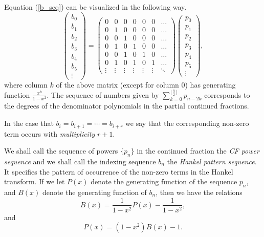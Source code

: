 \documentclass[12pt,reqno]{article}
\theoremstyle{definition}
\begin{document}
Equation (\ref{b_seq}) can be visualized in the following way.
\begin{displaymath}
\left(\begin{array}{c} b_0 \\ b_1 \\b_2\\ b_3 \\b_4 \\b_5 \\ \vdots \end{array}\right)=
\left(\begin{array}{ccccccc}0 & 0 & 0 & 0 & 0 & 0 & \ldots \\
                            0 & 1 & 0 & 0 & 0 & 0 & \ldots \\
                            0 & 0 & 1 & 0& 0 & 0 & \ldots \\
                            0 & 1 & 0 & 1 & 0 & 0 & \ldots \\
                            0 & 0 & 1&  0 & 1 & 0 & \ldots \\
                            0 & 1  & 0 & 1 & 0 & 1 &\ldots\\ \vdots
& \vdots &
\vdots & \vdots & \vdots & \vdots &
\ddots\end{array}\right)\left(\begin{array}{c} p_0 \\ p_1 \\p_2\\ p_3 \\p_4 \\p_5 \\ \vdots \end{array}\right),\end{displaymath} where column $k$ of the above matrix (except for column $0$) has generating function $\frac{x^k}{1-x^2}$. The sequence of numbers given by
$\sum_{k=0}^{\lfloor \frac{n}{2} \rfloor} p_{n-2k}$ corresponds to the degrees of the denominator polynomials in the partial continued fractions.

In the case that $b_i=b_{i+1}=\cdots =b_{i+r}$  we say that the corresponding non-zero term occurs with \emph{multiplicity} $r+1$.

We shall call the sequence of powers $\{p_n\}$ in the continued fraction the \emph{CF power sequence} and we shall call the indexing sequence $b_n$ the \emph{Hankel pattern sequence}. It specifies the pattern of occurrence of the non-zero terms in the Hankel transform. If we let $P(x)$ denote the generating function of the sequence $p_n$, and $B(x)$ denote the generating function of $b_n$, then we have the relations
\begin{equation} \label{rel_1} B(x)=\frac{1}{1-x^2}P(x)-\frac{1}{1-x^2},\end{equation} and
\begin{equation} \label{rel_2} P(x)=(1-x^2)B(x)-1.\end{equation}
\end{document}
